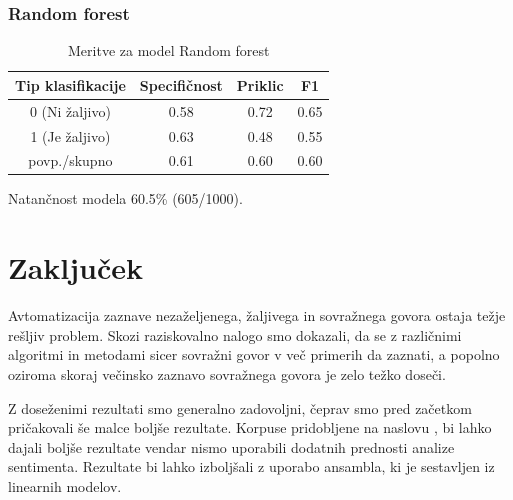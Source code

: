 \documentclass{acm_proc_article-sp}
\begin{document}
\subsubsection{Random forest}
\begin{table}[h!]
	\centering
	\caption{Meritve za model Random forest}
	\begin{tabular}{|c|c|c|c|}
		\hline
		\textbf{Tip klasifikacije} & \textbf{Specifičnost} & \textbf{Priklic} & \textbf{F1} \\ \hline
		0 (Ni žaljivo) & 0.58 & 0.72 & 0.65\\ \hline
		1 (Je žaljivo) & 0.63 & 0.48 & 0.55\\ \hline \hline
		povp./skupno & 0.61 & 0.60 & 0.60 \\ \hline
	\end{tabular}
\end{table}
Natančnost modela 60.5\% (605/1000).

\section{Zaključek}
Avtomatizacija zaznave nezaželjenega, žaljivega in sovražnega govora ostaja težje rešljiv problem. Skozi raziskovalno nalogo smo dokazali, da se z različnimi algoritmi in metodami sicer sovražni govor v več primerih da zaznati, a popolno oziroma skoraj večinsko zaznavo sovražnega govora je zelo težko doseči. 

Z doseženimi rezultati smo generalno zadovoljni, čeprav smo pred začetkom pričakovali še malce boljše rezultate.
Korpuse pridobljene na naslovu \cite{bworld}, bi lahko dajali boljše rezultate vendar nismo uporabili dodatnih prednosti analize sentimenta.
Rezultate bi lahko izboljšali z uporabo ansambla, ki je sestavljen iz linearnih modelov.


 
\end{document}
